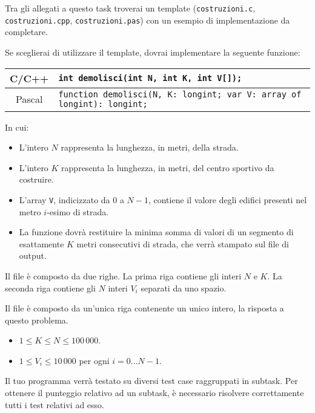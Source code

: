 \begin{warning}
Tra gli allegati a questo task troverai un template (\texttt{costruzioni.c}, \texttt{costruzioni.cpp}, \texttt{costruzioni.pas}) con un esempio di implementazione da completare.
\end{warning}

Se sceglierai di utilizzare il template, dovrai implementare la seguente funzione:
\begin{center}\begin{tabularx}{\textwidth}{|c|X|}
\hline
C/C++  & \verb|int demolisci(int N, int K, int V[]);|\\
\hline
Pascal & \verb|function demolisci(N, K: longint; var V: array of longint): longint;|\\
\hline
\end{tabularx}\end{center}
In cui:
\begin{itemize}[nolistsep]
  \item L'intero $N$ rappresenta la lunghezza, in metri, della strada.
  \item L'intero $K$ rappresenta la lunghezza, in metri, del centro sportivo da costruire.
  \item L'array \texttt{V}, indicizzato da $0$ a $N-1$, contiene il valore degli edifici presenti nel metro $i$-esimo di strada.
  \item La funzione dovrà restituire la minima somma di valori di un segmento di esattamente $K$ metri consecutivi di strada, che verrà stampato sul file di output.
\end{itemize}

\InputFile
Il file  è composto da due righe. La prima riga contiene gli interi $N$ e $K$. La seconda riga contiene gli $N$ interi $V_i$ separati da uno spazio.

\OutputFile
Il file \outputfile{} è composto da un'unica riga contenente un unico intero, la risposta a questo problema.

\Constraints
\begin{itemize}[nolistsep, itemsep=2mm]
	\item $1 \le K \le N \le 100\,000$.
	\item $1 \le V_i \le 10\,000$ per ogni $i=0\ldots N-1$.
\end{itemize}

\Scoring
Il tuo programma verrà testato su diversi test case raggruppati in subtask.
Per ottenere il punteggio relativo ad un subtask, è necessario risolvere
correttamente tutti i test relativi ad esso.

